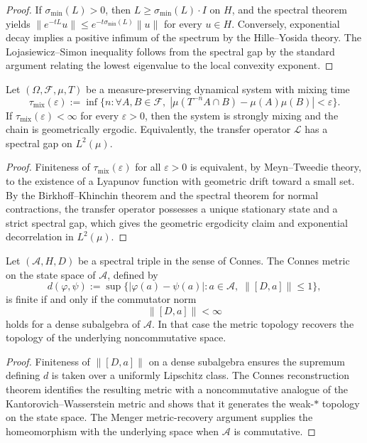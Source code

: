 \begin{proof}
If $\sigma_{\min}(L) > 0$, then $L \ge \sigma_{\min}(L) \cdot I$ on $H$, and the spectral theorem yields $\| e^{-tL} u \| \le e^{-t \sigma_{\min}(L)} \| u\|$ for every $u \in H$. Conversely, exponential decay implies a positive infimum of the spectrum by the Hille--Yosida theory. The Lojasiewicz--Simon inequality follows from the spectral gap by the standard argument relating the lowest eigenvalue to the local convexity exponent.
\end{proof}

\begin{theorem}\label{thm-ergodic-mixing-barrier}
Let $(\Omega, \mathcal F, \mu, T)$ be a measure-preserving dynamical system with mixing time
\[
\tau_{\mathrm{mix}}(\varepsilon) := \inf\bigl\{ n : \forall A,B \in \mathcal F,\; |\mu(T^{-n}A \cap B) - \mu(A)\mu(B)| < \varepsilon\bigr\}.
\]
If $\tau_{\mathrm{mix}}(\varepsilon) < \infty$ for every $\varepsilon > 0$, then the system is strongly mixing and the chain is geometrically ergodic. Equivalently, the transfer operator $\mathcal L$ has a spectral gap on $L^2(\mu)$.
\end{theorem}

\begin{proof}
Finiteness of $\tau_{\mathrm{mix}}(\varepsilon)$ for all $\varepsilon > 0$ is equivalent, by Meyn--Tweedie theory, to the existence of a Lyapunov function with geometric drift toward a small set. By the Birkhoff--Khinchin theorem and the spectral theorem for normal contractions, the transfer operator possesses a unique stationary state and a strict spectral gap, which gives the geometric ergodicity claim and exponential decorrelation in $L^2(\mu)$.
\end{proof}

\begin{theorem}\label{thm-spectral-distance}
Let $(\mathcal A, H, D)$ be a spectral triple in the sense of Connes. The Connes metric on the state space of $\mathcal A$, defined by
\[
d(\varphi, \psi) := \sup\bigl\{ |\varphi(a) - \psi(a)| : a \in \mathcal A, \; \|[D,a]\| \le 1\bigr\},
\]
is finite if and only if the commutator norm
\[
\|[D,a]\| < \infty
\]
holds for a dense subalgebra of $\mathcal A$. In that case the metric topology recovers the topology of the underlying noncommutative space.
\end{theorem}

\begin{proof}
Finiteness of $\|[D,a]\|$ on a dense subalgebra ensures the supremum defining $d$ is taken over a uniformly Lipschitz class. The Connes reconstruction theorem identifies the resulting metric with a noncommutative analogue of the Kantorovich--Wasserstein metric and shows that it generates the weak-$*$ topology on the state space. The Menger metric-recovery argument supplies the homeomorphism with the underlying space when $\mathcal A$ is commutative.
\end{proof}

